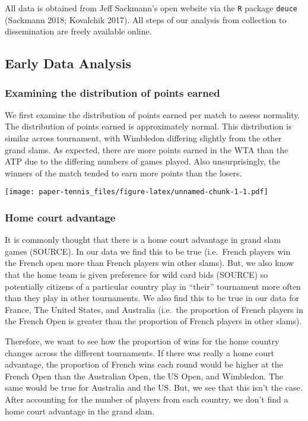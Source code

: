 \documentclass[]{article}
\begin{document}
All data is obtained from Jeff Sackmann's open website via the
\texttt{R} package \texttt{deuce} (Sackmann 2018; Kovalchik 2017). All
steps of our analysis from collection to dissemination are freely
available online.

\hypertarget{sec:eda}{%
\subsection{Early Data Analysis}\label{sec:eda}}

\hypertarget{examining-the-distribution-of-points-earned}{%
\subsubsection{Examining the distribution of points
earned}\label{examining-the-distribution-of-points-earned}}

We first examine the distribution of points earned per match to assess
normality. The distribution of points earned is approximately normal.
This distribution is similar across tournament, with Wimbledon differing
slightly from the other grand slams. As expected, there are more points
earned in the WTA than the ATP due to the differing numbers of games
played. Also unsurprisingly, the winners of the match tended to earn
more points than the losers.

\texttt{[image: paper-tennis\_files/figure-latex/unnamed-chunk-1-1.pdf]}

\hypertarget{home-court-advantage}{%
\subsubsection{Home court advantage}\label{home-court-advantage}}

It is commonly thought that there is a home court advantage in grand
slam games (SOURCE). In our data we find this to be true (i.e.~French
players win the French open more than French players win other slams).
But, we also know that the home team is given preference for wild card
bids (SOURCE) so potentially citizens of a particular country play in
``their'' tournament more often than they play in other tournaments. We
also find this to be true in our data for France, The United States, and
Australia (i.e.~the proportion of French players in the French Open is
greater than the proportion of French players in other slams).

Therefore, we want to see how the proportion of wins for the home
country changes across the different tournaments. If there was really a
home court advantage, the proportion of French wins each round would be
higher at the French Open than the Australian Open, the US Open, and
Wimbledon. The same would be true for Australia and the US. But, we see
that this isn't the case. After accounting for the number of players
from each country, we don't find a home court advantage in the grand
slam.
\end{document}

